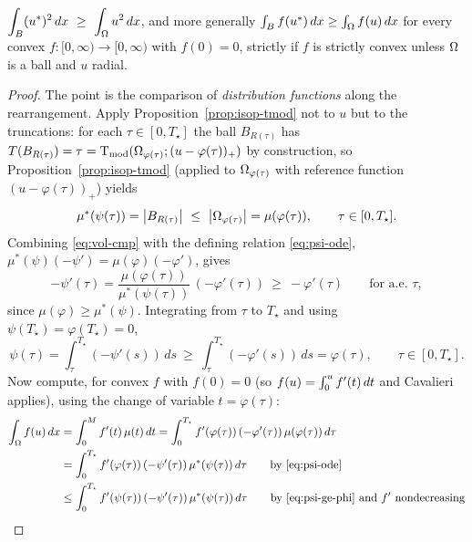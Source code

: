 \begin{lemma}\label{lem:B}
$\displaystyle\int_B(u^*)^2\,dx\ \ge\ \int_\Omega u^2\,dx$, and more generally
$\int_B f(u^*)\,dx\ge\int_\Omega f(u)\,dx$ for every convex
$f:[0,\infty)\to[0,\infty)$ with $f(0)=0$, strictly if $f$ is strictly
convex unless $\Omega$ is a ball and $u$ radial.
\end{lemma}

\begin{proof}
The point is the comparison of \emph{distribution functions} along the
rearrangement. Apply Proposition~\ref{prop:isop-tmod} not to $u$ but to the
truncations: for each $\tau\in[0,T_\star]$ the ball $B_{R(\tau)}$ has
$T(B_{R(\tau)})=\tau=\operatorname{T_{\mathrm{mod}}}(\Omega_{\varphi(\tau)};(u-\varphi(\tau))_+)$ by
construction, so Proposition~\ref{prop:isop-tmod} (applied to
$\Omega_{\varphi(\tau)}$ with reference function $(u-\varphi(\tau))_+$) yields
\begin{equation}\label{eq:vol-cmp}
  \mu^*(\psi(\tau))=\left|B_{R(\tau)}\right|\ \le\ \left|\Omega_{\varphi(\tau)}\right|
  =\mu(\varphi(\tau)),\qquad\tau\in[0,T_\star].
\end{equation}
Combining \eqref{eq:vol-cmp} with the defining relation
\eqref{eq:psi-ode}, $\mu^*(\psi)(-\psi')=\mu(\varphi)(-\varphi')$, gives
\begin{equation}\label{eq:psi-monotone}
  -\psi'(\tau)=\frac{\mu(\varphi(\tau))}{\mu^*(\psi(\tau))}\,(-\varphi'(\tau))
  \ \ge\ -\varphi'(\tau)\qquad\text{for a.e.\ }\tau,
\end{equation}
since $\mu(\varphi)\ge\mu^*(\psi)$. Integrating from $\tau$ to $T_\star$ and
using $\psi(T_\star)=\varphi(T_\star)=0$,
\begin{equation}\label{eq:psi-ge-phi}
  \psi(\tau)=\int_\tau^{T_\star}(-\psi'(s))\,ds
  \ \ge\ \int_\tau^{T_\star}(-\varphi'(s))\,ds=\varphi(\tau),
  \qquad\tau\in[0,T_\star].
\end{equation}
Now compute, for convex $f$ with $f(0)=0$ (so $f(u)=\int_0^u f'(t)\,dt$ and
Cavalieri applies), using the change of variable $t=\varphi(\tau)$:
\begin{align*}
  \int_\Om f(u)\dx
  &=\int_0^M f'(t)\,\mu(t)\dt
  =\int_0^{T_\star}f'(\varphi(\tau))\,(-\varphi'(\tau))\,\mu(\varphi(\tau))\,d\tau\\
  &=\int_0^{T_\star}f'(\varphi(\tau))\,(-\psi'(\tau))\,\mu^*(\psi(\tau))\,d\tau
  \qquad\text{by \eqref{eq:psi-ode}}\\
  &\le\int_0^{T_\star}f'(\psi(\tau))\,(-\psi'(\tau))\,\mu^*(\psi(\tau))\,d\tau
  \qquad\text{by \eqref{eq:psi-ge-phi} and $f'$ nondecreasing}\\

\end{align*}
\end{proof}
